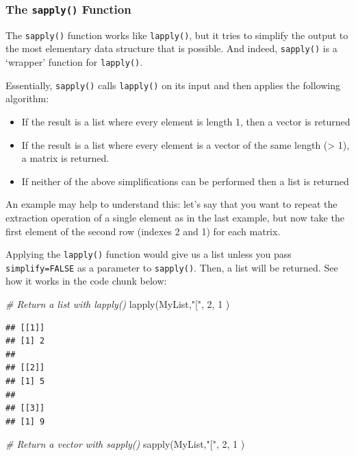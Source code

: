 \documentclass[
]{book}
\newenvironment{Shaded}{\begin{snugshade}}{\end{snugshade}}
\newcommand{\CommentTok}[1]{\textcolor[rgb]{0.56,0.35,0.01}{\textit{#1}}}
\newcommand{\DecValTok}[1]{\textcolor[rgb]{0.00,0.00,0.81}{#1}}
\newcommand{\FunctionTok}[1]{\textcolor[rgb]{0.00,0.00,0.00}{#1}}
\newcommand{\NormalTok}[1]{#1}
\newcommand{\StringTok}[1]{\textcolor[rgb]{0.31,0.60,0.02}{#1}}
\providecommand{\tightlist}{%
  \setlength{\itemsep}{0pt}\setlength{\parskip}{0pt}}
\theoremstyle{definition}
\theoremstyle{definition}
\theoremstyle{definition}
\theoremstyle{definition}
\theoremstyle{remark}
\begin{document}
\hypertarget{the-sapply-function}{%
\subsubsection{\texorpdfstring{The \texttt{sapply()} Function}{The sapply() Function}}\label{the-sapply-function}}

The \texttt{sapply()} function works like \texttt{lapply()}, but it tries to simplify the output to the most elementary data structure that is possible. And indeed, \texttt{sapply()} is a `wrapper' function for \texttt{lapply()}.

Essentially, \texttt{sapply()} calls \texttt{lapply()} on its input and then applies the following algorithm:

\begin{itemize}
\tightlist
\item
  If the result is a list where every element is length 1, then a vector is returned
\item
  If the result is a list where every element is a vector of the same length (\textgreater{} 1), a matrix is returned.
\item
  If neither of the above simplifications can be performed then a list is returned
\end{itemize}

An example may help to understand this: let's say that you want to repeat the extraction operation of a single element as in the last example, but now take the first element of the second row (indexes 2 and 1) for each matrix.

Applying the \texttt{lapply()} function would give us a list unless you pass \texttt{simplify=FALSE} as a parameter to \texttt{sapply()}. Then, a list will be returned. See how it works in the code chunk below:

\begin{Shaded}
\begin{Highlighting}[]
\CommentTok{\# Return a list with \textasciigrave{}lapply()\textasciigrave{}}
\FunctionTok{lapply}\NormalTok{(MyList,}\StringTok{"["}\NormalTok{, }\DecValTok{2}\NormalTok{, }\DecValTok{1}\NormalTok{ )}
\end{Highlighting}
\end{Shaded}

\begin{verbatim}
## [[1]]
## [1] 2
## 
## [[2]]
## [1] 5
## 
## [[3]]
## [1] 9
\end{verbatim}

\begin{Shaded}
\begin{Highlighting}[]
\CommentTok{\# Return a vector with \textasciigrave{}sapply()\textasciigrave{}}
\FunctionTok{sapply}\NormalTok{(MyList,}\StringTok{"["}\NormalTok{, }\DecValTok{2}\NormalTok{, }\DecValTok{1}\NormalTok{ )}
\end{Highlighting}
\end{Shaded}
\end{document}

